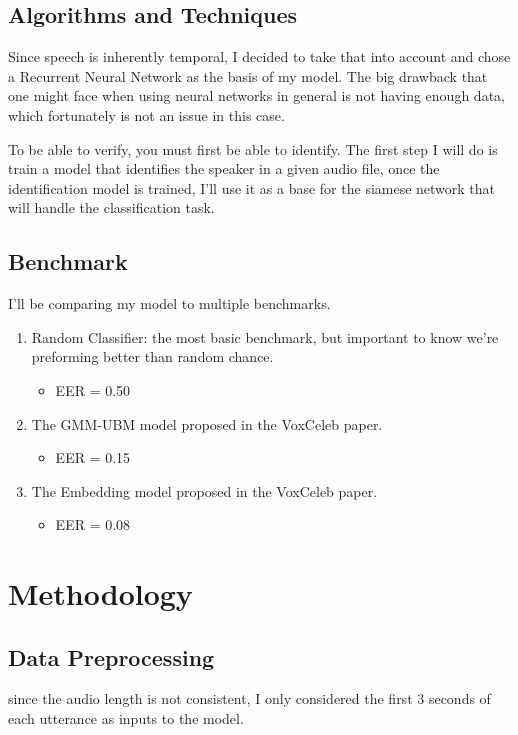 \documentclass{article}
\begin{document}
\subsection{Algorithms and Techniques}
Since speech is inherently temporal, I decided to take that into account and chose a Recurrent Neural Network as the basis of my model. The big drawback that one might face when using neural networks in general is not having enough data, which fortunately is not an issue in this case.

To be able to verify, you must first be able to identify. The first step I will do is train a model that identifies the speaker in a given audio file, once the identification model is trained, I'll use it as a base for the siamese network that will handle the classification task.
\subsection{Benchmark}

I'll be comparing my model to multiple benchmarks.

\begin{enumerate}
    \item Random Classifier: the most basic benchmark, but important to know we're preforming better than random chance.
    \begin{itemize}
        \item EER = 0.50
    \end{itemize}
    \item The GMM-UBM model proposed in the VoxCeleb paper.
    \begin{itemize}
        \item EER = 0.15
    \end{itemize}    
    \item The Embedding model proposed in the VoxCeleb paper.
    \begin{itemize}
        \item EER = 0.08
    \end{itemize}
\end{enumerate}

\section{Methodology}
\subsection{Data Preprocessing}
since the audio length is not consistent, I only considered the first 3 seconds of each utterance as inputs to the model. 
\end{document}
